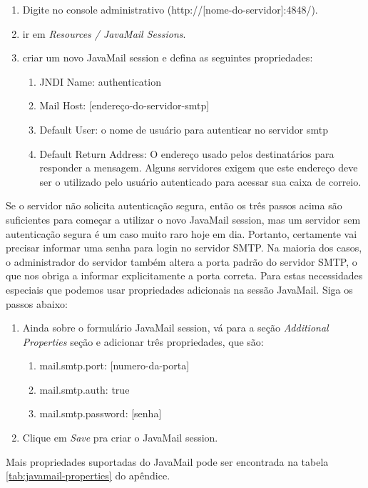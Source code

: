 \documentclass[envcountsame,envcountchap]{svmono}
\begin{document}
\begin{enumerate}
\item Digite no console administrativo (http://[nome-do-servidor]:4848/).
\item ir em \textit{Resources / JavaMail Sessions}.
\item criar um novo JavaMail session e defina as seguintes propriedades:
   \begin{enumerate}
   \item JNDI Name: authentication
   \item Mail Host: [endereço-do-servidor-smtp]
   \item Default User: o nome de usuário para autenticar no servidor smtp
   \item Default Return Address: O endereço usado pelos destinatários para responder a mensagem. Alguns servidores exigem que este endereço deve ser o utilizado pelo usuário autenticado para acessar sua caixa de correio.
   \end{enumerate}
\end{enumerate}
 
Se o servidor não solicita autenticação segura, então os três passos acima são suficientes para começar a utilizar o novo JavaMail session, mas um servidor sem autenticação segura é um caso muito raro hoje em dia. Portanto, certamente vai precisar informar uma senha para login no servidor SMTP. Na maioria dos casos, o administrador do servidor também altera a porta padrão do servidor SMTP, o que nos obriga a informar explicitamente a porta correta. Para estas necessidades especiais que podemos usar propriedades adicionais na sessão JavaMail. Siga os passos abaixo:

\begin{enumerate}
\item Ainda sobre o formulário JavaMail session, vá para a seção \textit{Additional Properties} seção e adicionar três propriedades, que são:
   \begin{enumerate}
   \item mail.smtp.port: [numero-da-porta]
   \item mail.smtp.auth: true
   \item mail.smtp.password: [senha]
   \end{enumerate}
\item Clique em \textit{Save} pra criar o JavaMail session.
\end{enumerate}

Mais propriedades suportadas do JavaMail pode ser encontrada na tabela \ref{tab:javamail-properties} do apêndice.
\end{document}
